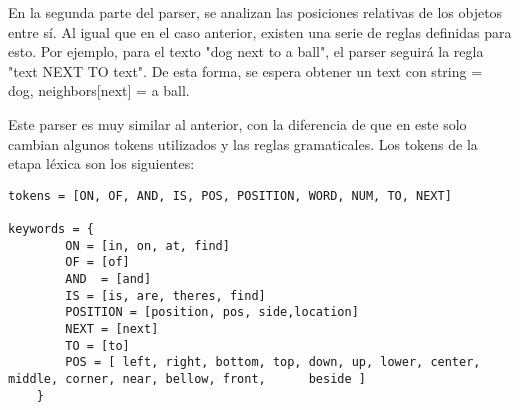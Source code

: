 En la segunda parte del parser, se analizan las posiciones relativas de los objetos entre sí. Al igual que en el caso anterior, existen una serie de reglas definidas para esto. Por ejemplo, para el texto "dog next to a ball", el parser seguirá la regla "text NEXT TO text". De esta forma, se espera obtener un text con string = dog, neighbors[next] = a ball.

Este parser es muy similar al anterior, con la diferencia de que en este solo cambian algunos tokens utilizados y las reglas gramaticales. Los tokens de la etapa léxica son los siguientes:

\begin{lstlisting}
tokens = [ON, OF, AND, IS, POS, POSITION, WORD, NUM, TO, NEXT]

keywords = {
        ON = [in, on, at, find]
        OF = [of]
        AND  = [and]
        IS = [is, are, theres, find]
        POSITION = [position, pos, side,location]
        NEXT = [next]
        TO = [to]
        POS = [ left, right, bottom, top, down, up, lower, center, middle, corner, near, bellow, front,      beside ]
    }
\end{lstlisting}

